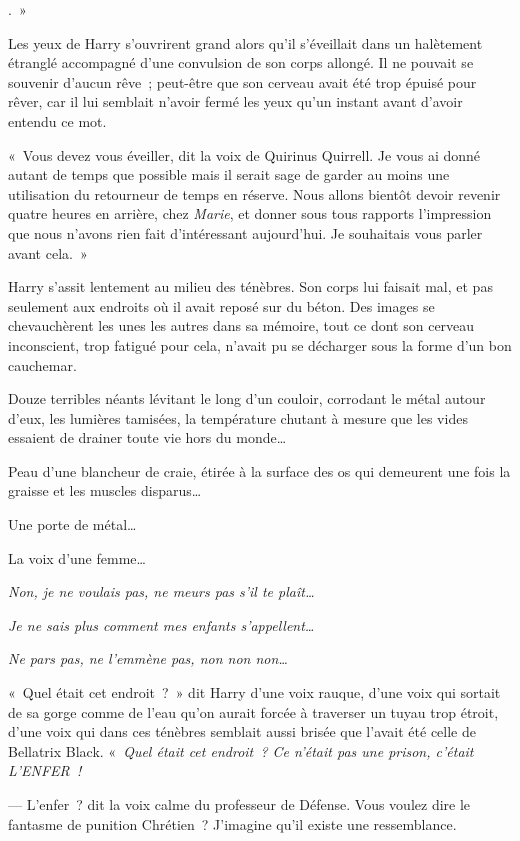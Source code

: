 
.~»

\hplettrineextrapara
Les yeux de Harry s'ouvrirent grand alors qu'il s'éveillait dans un halètement étranglé accompagné d'une convulsion de son corps allongé.
Il ne pouvait se souvenir d'aucun rêve~; peut-être que son cerveau avait été trop épuisé pour rêver, car il lui semblait n'avoir fermé les yeux qu'un instant avant d'avoir entendu ce mot.

«~Vous devez vous éveiller, dit la voix de Quirinus Quirrell.
Je vous ai donné autant de temps que possible mais il serait sage de garder au moins une utilisation du retourneur de temps en réserve.
Nous allons bientôt devoir revenir quatre heures en arrière, chez \emph{Marie}, et donner sous tous rapports l'impression que nous n'avons rien fait d'intéressant aujourd'hui.
Je souhaitais vous parler avant cela.~»

Harry s'assit lentement au milieu des ténèbres.
Son corps lui faisait mal, et pas seulement aux endroits où il avait reposé sur du béton.
Des images se chevauchèrent les unes les autres dans sa mémoire, tout ce dont son cerveau inconscient, trop fatigué pour cela, n'avait pu se décharger sous la forme d'un bon cauchemar.

Douze terribles néants lévitant le long d'un couloir, corrodant le métal autour d'eux, les lumières tamisées, la température chutant à mesure que les vides essaient de drainer toute vie hors du monde…

Peau d'une blancheur de craie, étirée à la surface des os qui demeurent une fois la graisse et les muscles disparus…

Une porte de métal…

La voix d'une femme…

\emph{Non, je ne voulais pas, ne meurs pas s'il te plaît…}

\emph{Je ne sais plus comment mes enfants s'appellent…}

\emph{Ne pars pas, ne l'emmène pas, non non non…}

«~Quel était cet endroit~?~»
dit Harry d'une voix rauque, d'une voix qui sortait de sa gorge comme de l'eau qu'on aurait forcée à traverser un tuyau trop étroit, d'une voix qui dans ces ténèbres semblait aussi brisée que l'avait été celle de Bellatrix Black.
«~\emph{Quel était cet endroit~?
Ce n'était pas une prison, c'était L'ENFER~!}

--- L'enfer~? dit la voix calme du professeur de Défense.
Vous voulez dire le fantasme de punition Chrétien~?
J'imagine qu'il existe une ressemblance.

